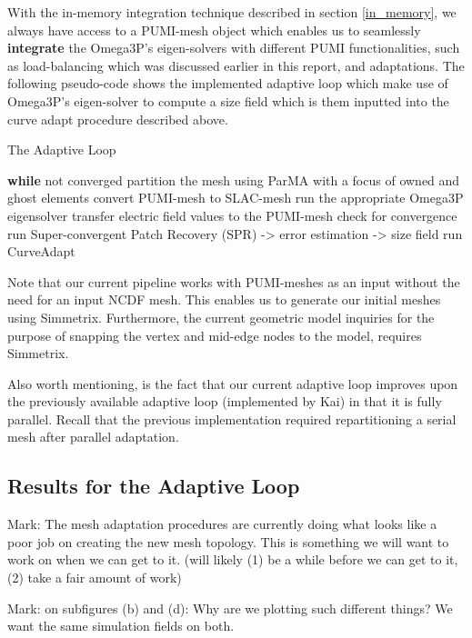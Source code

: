 \documentclass[review,12pt]{elsarticle_summary_report}
\begin{document}
With the in-memory integration technique described in section \ref{in_memory}, we always have access to a PUMI-mesh object which enables us to seamlessly \textbf{integrate} the Omega3P's eigen-solvers with different PUMI functionalities, such as load-balancing which was discussed earlier in this report, and adaptations. The following pseudo-code shows the implemented adaptive loop which make use of Omega3P's eigen-solver to compute a size field which is them inputted into the curve adapt procedure described above.

\begin{algorithm}
\caption{The Adaptive Loop}\label{adapt_loop}
\begin{algorithmic}[1]
\State \textbf{while} not converged
\State \quad partition the mesh using ParMA with a focus of owned and ghost elements
\State \quad convert PUMI-mesh to SLAC-mesh
\State \quad run the appropriate Omega3P eigensolver
\State \quad transfer electric field values to the PUMI-mesh
\State \quad check for convergence
\State \quad run Super-convergent Patch Recovery (SPR) -> error estimation -> size field
\State \quad run CurveAdapt
\end{algorithmic}
\end{algorithm}

Note that our current pipeline works with PUMI-meshes as an input without the need for an input NCDF mesh. This enables us to generate our initial meshes using Simmetrix. Furthermore, the current geometric model inquiries for the purpose of snapping the vertex and mid-edge nodes to the model, requires Simmetrix.

Also worth mentioning, is the fact that our current adaptive loop improves upon the previously available adaptive loop (implemented by Kai) in that it is fully parallel. Recall that the previous implementation required repartitioning a serial mesh after parallel adaptation.

\subsection{Results for the Adaptive Loop}

\color{blue} Mark: The mesh adaptation procedures are currently doing what looks like a poor job on creating the new mesh topology. This is something we will want to work on when we can get to it. (will likely (1) be a while before we can get to it, (2) take a fair amount of work) \color{black}

\color{blue} Mark: on subfigures (b) and (d): Why are we plotting such different things? We want the same simulation fields on both. \color{black}
\end{document}
